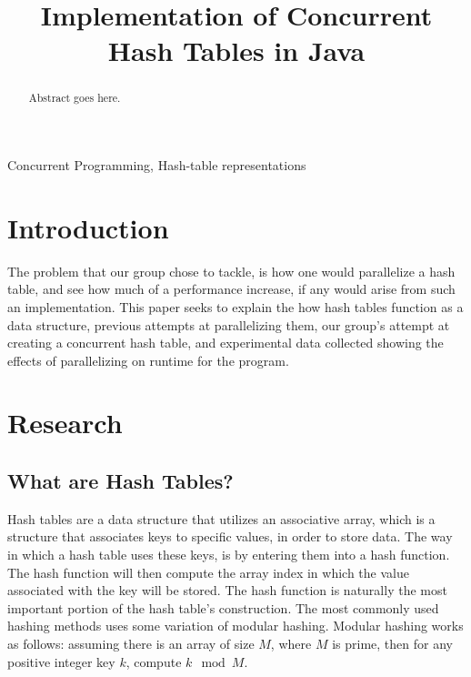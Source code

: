 \documentclass[conference]{IEEEtran}
\begin{document}
\title{Implementation of Concurrent Hash Tables in Java}

\author{
\and
{}
\and
{}
}

\maketitle

\begin{abstract}
Abstract goes here.
\end{abstract}

\begin{IEEEkeywords}
Concurrent Programming, Hash-table representations
\end{IEEEkeywords}

\section{Introduction}
The problem that our group chose to tackle, is how one would parallelize a hash table, and see how much of a performance increase,
if any would arise from such an implementation. This paper seeks to explain the how hash tables function as a data structure, previous
attempts at parallelizing them, our group's attempt at creating a concurrent hash table, and experimental data collected showing the
effects of parallelizing on runtime for the program.

\section{Research}
\subsection{What are Hash Tables?}
Hash tables are a data structure that utilizes an associative array, which is a structure that associates keys to specific values, in order to store data. The way
in which a hash table uses these keys, is by entering them into a hash function. The hash function will then compute the array index in which
the value associated with the key will be stored. The hash function is naturally the most important portion of the hash table's construction.
The most commonly used hashing methods uses some variation of modular hashing. Modular hashing works as follows: assuming there is an array of size
$M$, where $M$ is prime, then for any positive integer key $k$, compute $k \mod{M}$. 
\end{document}
